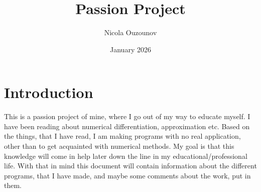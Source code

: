 \documentclass{article}
\title{Passion Project}
\author{Nicola Ouzounov}
\date{January 2026}
\begin{document}
\maketitle
\tableofcontents

\section{Introduction}
This is a passion project of mine, where I go out of my way to educate myself.
I have been reading about numerical differentiation, approximation etc.
Based on the things, that I have read, I am making programs with no real application, other than to get acquainted with numerical methods.
My goal is that this knowledge will come in help later down the line in my educational/professional life.
With that in mind this document will contain information about the different programs, that I have made, and maybe some comments about the work, put in them.\\
\end{document}
